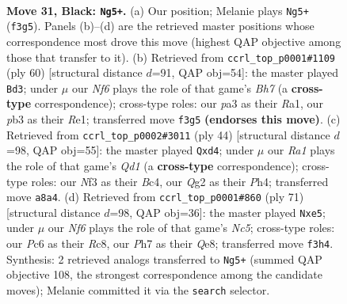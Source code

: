 \documentclass[11pt]{article}
\begin{document}
\clearpage

\begin{figure}[p]\centering
\begin{subfigure}{0.46\textwidth}\centering
\resizebox{\linewidth}{!}{%
\newchessgame
\chessboard[
  setfen={r6r/4k2p/1pp1p1p1/8/1p1PK2P/PP2Pnb1/R5q1/2BQ4 b - - 0 31},
  showmover=false,
  pgfstyle=straightmove, color=movearrow, markmove={f3-g5}
]}
\caption{}
\end{subfigure}\hfill
\begin{subfigure}{0.46\textwidth}\centering
\resizebox{\linewidth}{!}{%
\newchessgame
\chessboard[
  setfen={5r1k/pb2bppB/4p2p/npq3NQ/5P2/2P4P/P5P1/R3R2K w - - 8 31},
  showmover=false,
  pgfstyle=straightmove, color=movearrow, markmove={h7-d3}
]}
\caption{}
\end{subfigure}
\\[4pt]
\begin{subfigure}{0.46\textwidth}\centering
\resizebox{\linewidth}{!}{%
\newchessgame
\chessboard[
  setfen={b6r/3n1pk1/4p2p/1Nq1P1p1/2Bp3P/8/1P3PP1/3QR1K1 w - - 1 23},
  showmover=false,
  pgfstyle=straightmove, color=movearrow, markmove={d1-d4}
]}
\caption{}
\end{subfigure}\hfill
\begin{subfigure}{0.46\textwidth}\centering
\resizebox{\linewidth}{!}{%
\newchessgame
\chessboard[
  setfen={2r1q1k1/8/p2p1Rpb/1p2P2p/1PnB4/P1Q3PP/6B1/6K1 b - - 0 36},
  showmover=false,
  pgfstyle=straightmove, color=movearrow, markmove={c4-e5}
]}
\caption{}
\end{subfigure}
\caption{\textbf{Move 31, Black: \texttt{Ng5+}.} (a) Our position; Melanie plays \texttt{Ng5+} (\texttt{f3g5}). Panels (b)--(d) are the retrieved master positions whose correspondence most drove this move (highest QAP objective among those that transfer to it). (b) Retrieved from \texttt{ccrl\_top\_p0001\#1109} (ply 60) [structural distance $d$=91, QAP obj=54]: the master played \texttt{Bd3}; under $\mu$ our \emph{Nf6} plays the role of that game's \emph{Bh7} (a \textbf{cross-type} correspondence); cross-type roles: our \emph{p}a3 as their \emph{R}a1, our \emph{p}b3 as their \emph{R}e1; transferred move \texttt{f3g5} \textbf{(endorses this move)}. (c) Retrieved from \texttt{ccrl\_top\_p0002\#3011} (ply 44) [structural distance $d$=98, QAP obj=55]: the master played \texttt{Qxd4}; under $\mu$ our \emph{Ra1} plays the role of that game's \emph{Qd1} (a \textbf{cross-type} correspondence); cross-type roles: our \emph{N}f3 as their \emph{B}c4, our \emph{Q}g2 as their \emph{P}h4; transferred move \texttt{a8a4}. (d) Retrieved from \texttt{ccrl\_top\_p0001\#860} (ply 71) [structural distance $d$=98, QAP obj=36]: the master played \texttt{Nxe5}; under $\mu$ our \emph{Nf6} plays the role of that game's \emph{Nc5}; cross-type roles: our \emph{P}c6 as their \emph{R}c8, our \emph{P}h7 as their \emph{Q}e8; transferred move \texttt{f3h4}. Synthesis: 2 retrieved analogs transferred to \texttt{Ng5+} (summed QAP objective 108, the strongest correspondence among the candidate moves); Melanie committed it via the \texttt{search} selector.}
\label{fig:thought-m61}
\end{figure}
\end{document}
